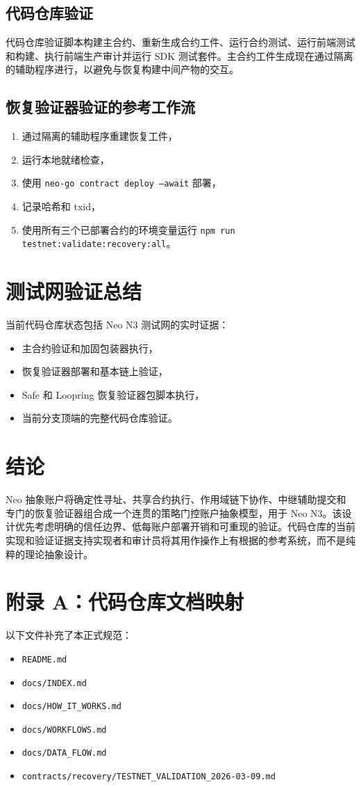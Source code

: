 \documentclass[11pt]{article}
\newcommand{\code}[1]{\texttt{#1}}
\newcommand{\aasystem}{Neo 抽象账户}
\begin{document}
\subsection{代码仓库验证}
代码仓库验证脚本构建主合约、重新生成合约工件、运行合约测试、运行前端测试和构建、执行前端生产审计并运行 SDK 测试套件。主合约工件生成现在通过隔离的辅助程序进行，以避免与恢复构建中间产物的交互。

\subsection{恢复验证器验证的参考工作流}
\begin{enumerate}
  \item 通过隔离的辅助程序重建恢复工件，
  \item 运行本地就绪检查，
  \item 使用 \code{neo-go contract deploy --await} 部署，
  \item 记录哈希和 txid，
  \item 使用所有三个已部署合约的环境变量运行 \code{npm run testnet:validate:recovery:all}。
\end{enumerate}

\section{测试网验证总结}
当前代码仓库状态包括 Neo N3 测试网的实时证据：
\begin{itemize}
  \item 主合约验证和加固包装器执行，
  \item 恢复验证器部署和基本链上验证，
  \item Safe 和 Loopring 恢复验证器包脚本执行，
  \item 当前分支顶端的完整代码仓库验证。
\end{itemize}

\section{结论}
\aasystem{}将确定性寻址、共享合约执行、作用域链下协作、中继辅助提交和专门的恢复验证器组合成一个连贯的策略门控账户抽象模型，用于 Neo N3。该设计优先考虑明确的信任边界、低每账户部署开销和可重现的验证。代码仓库的当前实现和验证证据支持实现者和审计员将其用作操作上有根据的参考系统，而不是纯粹的理论抽象设计。

\appendix
\section{附录 A：代码仓库文档映射}
以下文件补充了本正式规范：
\begin{itemize}
  \item \code{README.md}
  \item \code{docs/INDEX.md}
  \item \code{docs/HOW\_IT\_WORKS.md}
  \item \code{docs/WORKFLOWS.md}
  \item \code{docs/DATA\_FLOW.md}
  \item \code{contracts/recovery/TESTNET\_VALIDATION\_2026-03-09.md}
\end{itemize}
\end{document}

